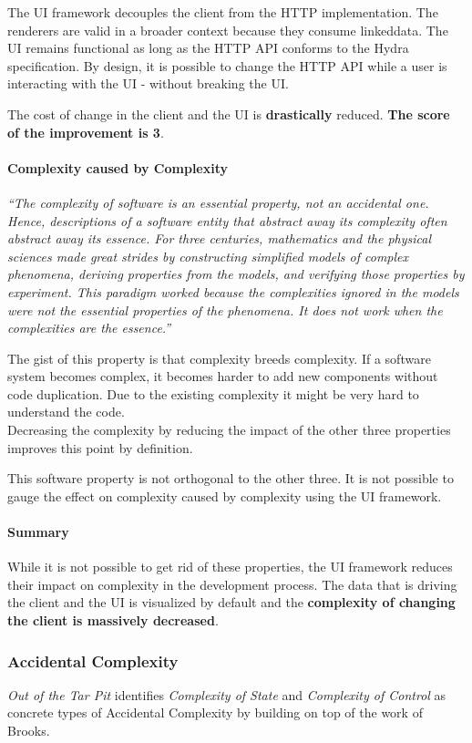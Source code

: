 The UI framework decouples the client from the HTTP implementation. The renderers are valid in a broader context because they consume \gls{linkeddata}. The UI remains functional as long as the HTTP API conforms to the Hydra specification. By design, it is possible to change the HTTP API while a user is interacting with the UI - without breaking the UI.

The cost of change in the client and the UI is \textbf{drastically} reduced. \textbf{The score of the improvement is 3}.

\paragraph{Complexity caused by Complexity}
\textit{``The complexity of software is an essential property, not an accidental one. Hence, descriptions of a software entity that abstract away its complexity often abstract away its essence. For three centuries, mathematics and the physical sciences made great strides by constructing simplified models of complex phenomena, deriving properties from the models, and verifying those properties by experiment. This paradigm worked because the complexities ignored in the models were not the essential properties of the phenomena. It does not work when the complexities are the essence.''} \citep[p.~3]{nosilverbullet}

The gist of this property is that complexity breeds complexity. If a software system becomes complex, it becomes harder to add new components without code duplication. Due to the existing complexity it might be very hard to understand the code. \\ Decreasing the complexity by reducing the impact of the other three properties improves this point by definition.

This software property is not orthogonal to the other three. It is not possible to gauge the effect on complexity caused by complexity using the UI framework.

\paragraph{Summary}
While it is not possible to get rid of these properties, the UI framework reduces their impact on complexity in the development process. The data that is driving the client and the UI is visualized by default and the \textbf{complexity of changing the client is massively decreased}.

\subsubsection{Accidental Complexity}
\textit{Out of the Tar Pit} identifies \textit{Complexity of State} and \textit{Complexity of Control} as concrete types of Accidental Complexity by building on top of the work of Brooks.

